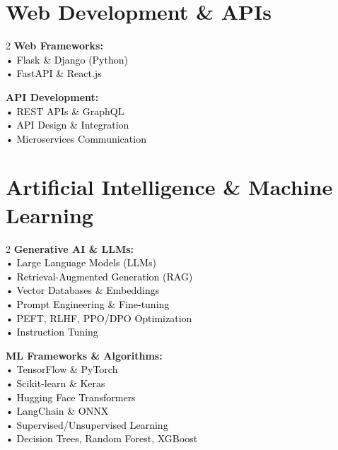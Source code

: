 \documentclass[10pt, letterpaper]{article}
\newcommand{\skillcat}[1]{%
    \textbf{\color{darkBlue}#1}%
}
\newcommand{\skillitem}[1]{%
    \textcolor{black}{#1}%
}
\begin{document}
\section{Web Development \& APIs}

\begin{tcolorbox}[colback=lightGray!50, colframe=accentColor, arc=3mm, boxrule=1pt]
\begin{multicols}{2}
\skillcat{Web Frameworks:} \\
\skillitem{• Flask \& Django (Python)} \\
\skillitem{• FastAPI \& React.js} \\

\columnbreak

\skillcat{API Development:} \\
\skillitem{• REST APIs \& GraphQL} \\
\skillitem{• API Design \& Integration} \\
\skillitem{• Microservices Communication} \\
\end{multicols}
\end{tcolorbox}

\section{Artificial Intelligence \& Machine Learning}

\begin{tcolorbox}[colback=lightBlue!10, colframe=primaryColor, arc=3mm, boxrule=1pt]
\begin{multicols}{2}
\skillcat{Generative AI \& LLMs:} \\
\skillitem{• Large Language Models (LLMs)} \\
\skillitem{• Retrieval-Augmented Generation (RAG)} \\
\skillitem{• Vector Databases \& Embeddings} \\
\skillitem{• Prompt Engineering \& Fine-tuning} \\
\skillitem{• PEFT, RLHF, PPO/DPO Optimization} \\
\skillitem{• Instruction Tuning} \\

\columnbreak

\skillcat{ML Frameworks \& Algorithms:} \\
\skillitem{• TensorFlow \& PyTorch} \\
\skillitem{• Scikit-learn \& Keras} \\
\skillitem{• Hugging Face Transformers} \\
\skillitem{• LangChain \& ONNX} \\
\skillitem{• Supervised/Unsupervised Learning} \\
\skillitem{• Decision Trees, Random Forest, XGBoost} \\
\end{multicols}
\end{tcolorbox}
\end{document}
